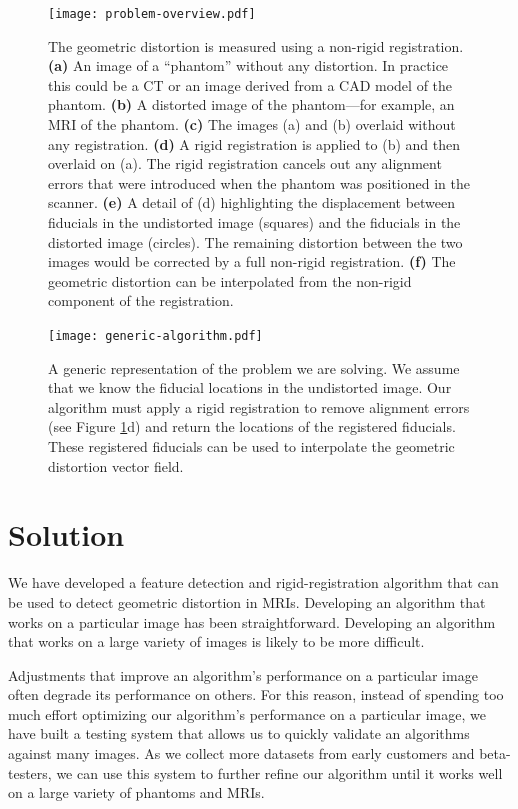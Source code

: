 \documentclass[12pt]{article}
\begin{document}
\begin{figure}[h]
    \centering
    \texttt{[image: problem-overview.pdf]}
    \caption{The geometric distortion is measured using a non-rigid registration. \textbf{(a)} An image of a ``phantom'' without any distortion.  In practice this could be a CT or an image derived from a CAD model of the phantom.  \textbf{(b)} A distorted image of the phantom---for example, an MRI of the phantom.  \textbf{(c)} The images (a) and (b) overlaid without any registration.  \textbf{(d)} A rigid registration is applied to (b) and then overlaid on (a).  The rigid registration cancels out any alignment errors that were introduced when the phantom was positioned in the scanner. \textbf{(e)} A detail of (d) highlighting the displacement between fiducials in the undistorted image (squares) and the fiducials in the distorted image (circles).  The remaining distortion between the two images would be corrected by a full non-rigid registration. \textbf{(f)} The geometric distortion can be interpolated from the non-rigid component of the registration.}
    \label{fig:problem-overview}
\end{figure}

\begin{figure}[h!]
    \centering
    \texttt{[image: generic-algorithm.pdf]}
    \caption{A generic representation of the problem we are solving. We assume that we know the fiducial locations in the undistorted image.  Our algorithm must apply a rigid registration to remove alignment errors (see Figure \ref{fig:problem-overview}d) and return the locations of the registered fiducials.  These registered fiducials can be used to interpolate the geometric distortion vector field.}
    \label{fig:generic-algorithm}
\end{figure}


\section*{Solution}
We have developed a feature detection and rigid-registration algorithm that can be used to detect geometric distortion in MRIs.  Developing an algorithm that works on a particular image has been straightforward.  Developing an algorithm that works on a large variety of images is likely to be more difficult.

Adjustments that improve an algorithm's performance on a particular image often degrade its performance on others.  For this reason, instead of spending too much effort optimizing our algorithm's performance on a particular image, we have built a testing system that allows us to quickly validate an algorithms against many images.  As we collect more datasets from early customers and beta-testers, we can use this system to further refine our algorithm until it works well on a large variety of phantoms and MRIs.
\end{document}
